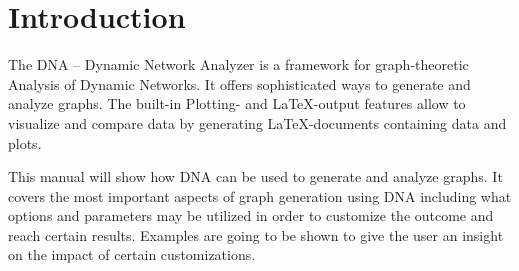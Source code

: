 \chapter{Introduction}
The DNA – Dynamic Network Analyzer is a framework for graph-theoretic Analysis of Dynamic Networks. It offers sophisticated ways to generate and analyze graphs. The built-in Plotting- and LaTeX-output features allow to visualize and compare data by generating LaTeX-documents containing data and plots.

This manual will show how DNA can be used to generate and analyze graphs. It covers the most important aspects of graph generation using DNA including what options and parameters may be utilized in order to customize the outcome and reach certain results. Examples are going to be shown to give the user an insight on the impact of certain customizations.